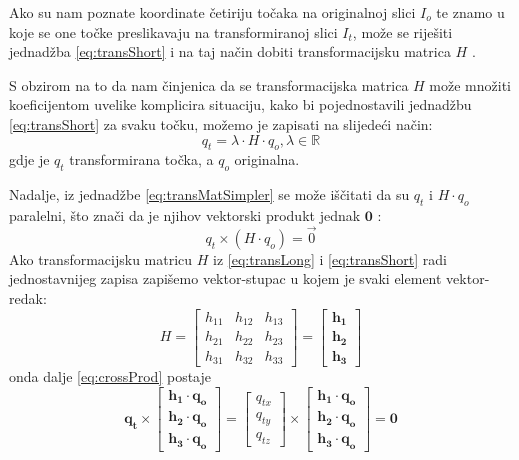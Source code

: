 Ako su nam poznate koordinate četiriju točaka na originalnoj slici $I_o$ te znamo u koje se one točke preslikavaju na transformiranoj slici $I_t$, može se riješiti jednadžba \eqref{eq:transShort} i na taj način dobiti transformacijsku matrica $H$ \citep{segvicDinAn3D}.

S obzirom na to da nam činjenica da se transformacijska matrica $H$ može množiti koeficijentom uvelike komplicira situaciju, kako bi pojednostavili jednadžbu \eqref{eq:transShort} za svaku točku, možemo je zapisati na slijedeći način:
\begin{equation}
q_t = \lambda \cdot H \cdot q_o, \lambda \in \mathbb{R}
\label{eq:transMatSimpler}
\end{equation}
gdje je $q_t$ transformirana točka, a $q_o$ originalna.

Nadalje, iz jednadžbe \eqref{eq:transMatSimpler} se može iščitati da su $q_t$ i $H \cdot q_o$ paralelni, što znači da je njihov vektorski produkt jednak $\mathbf{0}$ \citep{vecParallel}:
\begin{equation}
\label{eq:crossProd}
q_t \times (H \cdot q_o) = \vec{0}
\end{equation}
Ako transformacijsku matricu $H$ iz \eqref{eq:transLong} i \eqref{eq:transShort} radi jednostavnijeg zapisa zapišemo vektor-stupac u kojem je svaki element vektor-redak:
\begin{equation}
H = \left[
\begin{matrix}
h_{11} & h_{12} & h_{13} \\
h_{21} & h_{22} & h_{23} \\
h_{31} & h_{32} & h_{33}
\end{matrix}
\right]
= \left[
\begin{matrix}
\mathbf {h_1} \\
\mathbf{h_2} \\
\mathbf{h_3}
\end{matrix}
\right]
\end{equation}
onda dalje \eqref{eq:crossProd} postaje
\begin{equation}
\label{eq:transCrossProdLong}
\mathbf{q_t} \times \left[
\begin{matrix}
\mathbf {h_1} \cdot \mathbf{q_o} \\
\mathbf{h_2} \cdot \mathbf{q_o} \\
\mathbf{h_3} \cdot \mathbf{q_o}
\end{matrix}
\right]
= \left[
\begin{matrix}
q_{tx} \\
q_{ty} \\
q_{tz}
\end{matrix}
\right]
\times \left[
\begin{matrix}
\mathbf {h_1} \cdot \mathbf{q_o} \\
\mathbf{h_2} \cdot \mathbf{q_o} \\
\mathbf{h_3} \cdot \mathbf{q_o}
\end{matrix}
\right]
= \mathbf{0}
\end{equation}

